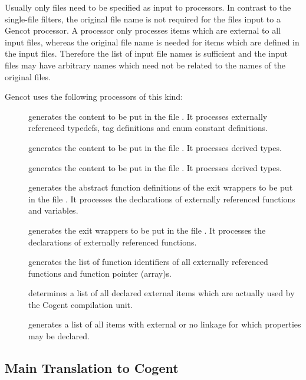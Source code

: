Usually only  files need to be specified as input to processors.
In contrast to the single-file filters, the original file name is not required for the files input to a 
Gencot processor. A processor only processes items which are external to all input files, whereas the original
file name is needed for items which are defined in the input files. Therefore the list of input file names is
sufficient and the input files may have arbitrary names which need not be related to the names of the original 
 files.

Gencot uses the following processors of this kind:
\begin{description}
\item[] generates the content to be put in the file . It 
processes externally referenced typedefs, tag definitions and enum constant definitions.
\item[] generates the content to be put in the file . It 
processes derived types.
\item[] generates the content to be put in the file . It 
processes derived types.
\item[] generates the abstract function definitions of the exit wrappers to be put in the file 
. It processes the declarations of externally referenced functions and variables.
\item[] generates the exit wrappers to be put in the file . It processes
the declarations of externally referenced functions.
\item[] generates the list of function identifiers of all externally referenced functions and
function pointer (array)s.
\item[] determines a list of all declared external items which are actually used by the Cogent
compilation unit.
\item[] generates a list of all items with external or no linkage 
for which properties may be declared.
\end{description}

\subsection{Main Translation to Cogent}
\label{impl-ccomps-main}

